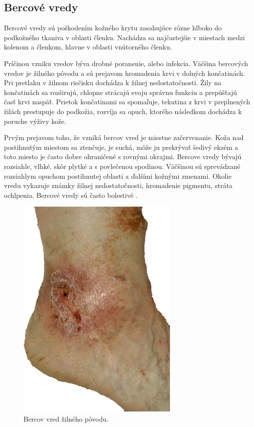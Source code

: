 \subsection{Bercové vredy}
Bercové vredy sú poškodením kožného krytu zasahujúce rôzne hlboko do podkožného tkaniva v oblasti členku. Nachádza sa najčastejšie v miestach medzi kolenom a členkom, hlavne v oblasti vnútorného členku.

Príčinou vzniku vredov býva drobné poranenie, alebo infekcia. Väčšina bercových vredov je žilného pôvodu a sú prejavom hromadenia krvi v dolných končatinách. Pri pretlaku v žilnom riečisku dochádza k žilnej nedostatočnosti. Žily na končatinách sa rozširujú, chlopne strácajú svoju správnu funkciu a prepúšťajú časť krvi naspäť. Prietok končatinami sa spomaľuje, tekutina z krvi v preplnených žilách prestupuje do podkožia, rozvíja sa opuch, ktorého následkom dochádza k poruche výživy kože. 

Prvým prejavom toho, že vzniká bercov vred je miestne začervenanie. Koža nad postihnutým miestom sa ztenčuje, je suchá, môže ju prekrývať šedivý ekzém a toto miesto je často dobre ohraničené s rovnými okrajmi. Bercove vredy bývajú rozsiahle, vlhké, skôr plytké a s povlečenou spodinou. Väčšinou sú sprevádzané rozsiahlym opuchom postihnutej oblasti a ďalšími kožnými zmenami. Okolie vredu vykazuje známky žilnej nedostatočnosti, hromadenie pigmentu, stráta ochlpenia. Bercové vredy sú často bolestivé \cite{pcCdSrbbhhlr5YcQ, Pokorna2012}.
\begin{figure}[h]
  \centering
  \includegraphics[scale=0.50]{fig/bercov-vred.png}
  \caption{Bercov vred žilného pôvodu. \cite{BsyXZC783dJbfdc7}}
  \label{fig:bercov-vred}
\end{figure}

